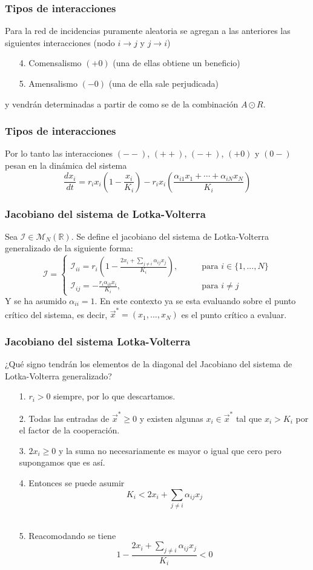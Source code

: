 \documentclass[10pt]{beamer}
\begin{document}
\begin{frame}
  \frametitle{Tipos de interacciones}
   Para la red de incidencias puramente aleatoria se agregan a las anteriores las siguientes interacciones (nodo $i\to j$ y $j\to i$)
  \newline
  \begin{itemize}
  	\item[4.] Comensalismo $(+0)$ (una de ellas obtiene un beneficio)
  	\item[5.] Amensalismo $(-0)$ (una de ella sale perjudicada)
  \end{itemize}
  y vendrán determinadas a partir de como se de la combinación $A\odot R$.
\end{frame}
\begin{frame}
	\frametitle{Tipos de interacciones}
	Por lo tanto las interacciones $(--)$, $(++)$, $(-+)$, $(+0)$ y $(0-)$ pesan en la dinámica del sistema
	$$\frac{dx_i}{dt}=r_ix_i\left (1-\frac{x_i}{K_i}\right )-r_ix_i\left (\frac{\alpha_{i1}x_1+\cdots+\alpha_{iN}x_N}{K_i}\right )$$
\end{frame}
\begin{frame}
  \frametitle{Jacobiano del sistema de Lotka-Volterra}
  Sea $\mathcal{I}\in\mathcal{M}_N(\mathbb{R})$. Se define el jacobiano del sistema de Lotka-Volterra generalizado de la siguiente forma:
  $$\mathcal{I}=\begin{cases}
  	\mathcal{I}_{ii}=r_i\left (1-\frac{2x_i+\sum_{j\neq i}\alpha_{ij}x_j}{K_i}\right ),\qquad&\text{para }i\in\{1,...,N\}\\
  	\mathcal{I}_{ij}=-\frac{r_i\alpha_{ik}x_i}{K_i},\qquad&\text{para }i\neq j
  \end{cases}$$
  Y se ha asumido $\alpha_{ii}=1$. En este contexto ya se esta evaluando sobre el punto crítico del sistema, es decir, $\vec{x}^*=(x_1,...,x_N)$ es el punto crítico a evaluar.
\end{frame}
\begin{frame}
  \frametitle{Jacobiano del sistema Lotka-Volterra}
  ¿Qué signo tendrán los elementos de la diagonal del Jacobiano del sistema de Lotka-Volterra generalizado?
  \begin{itemize}
  	\item [1.] $r_i>0$ siempre, por lo que descartamos.
  	\item [2.] Todas las entradas de $\vec{x}^*\geq 0$ y existen algunas $x_i\in\vec{x}^*$ tal que $x_i>K_i$ por el factor de la cooperación.
  	\item [3.] $2x_i\geq 0$ y la suma no necesariamente es mayor o igual que cero pero supongamos que es así.\\
  	\item [4.] Entonces se puede asumir $$K_i< 2x_i+\sum_{j\neq i}\alpha_{ij}x_j$$\\
  	\item [5.] Reacomodando se tiene $$1-\frac{2x_i+\sum_{j\neq i}\alpha_{ij}x_j}{K_i}<0$$  
  \end{itemize}  
\end{frame}
\end{document}
